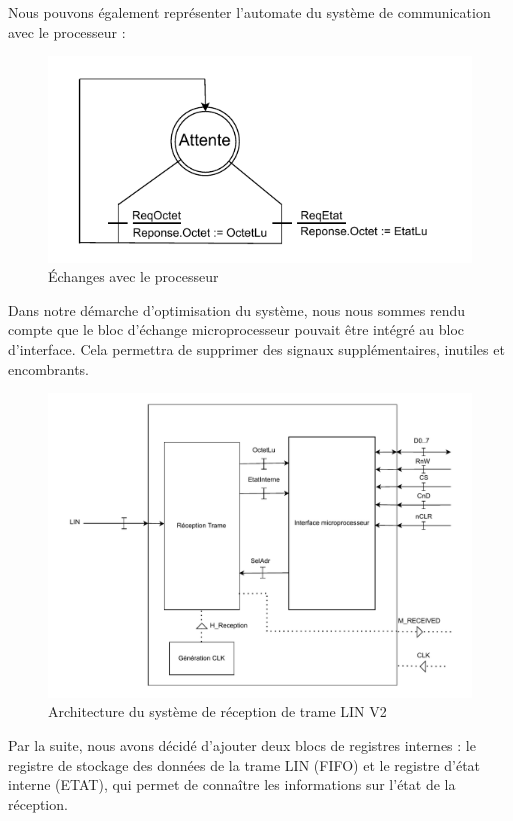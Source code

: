 Nous pouvons également représenter l'automate du système de communication avec le processeur : 

\begin{figure}[H]
    \centering
    \includegraphics[width=0.8\linewidth]{images/inter/Echange_Processeur.pdf}
    \caption{Échanges avec le processeur}
    \label{fig:placeholder}
\end{figure}


Dans notre démarche d'optimisation du système, nous nous sommes rendu compte que le bloc d'échange 
microprocesseur pouvait être intégré au bloc d'interface. Cela permettra de supprimer des signaux 
supplémentaires, inutiles et encombrants.
\newline

\begin{figure}[H]
    \centering
    \includegraphics[width=0.8\linewidth]{images/inter/Schema_avance_circuit.pdf}
    \caption{Architecture du système de réception de trame LIN V2}
    \label{fig:placeholder}
\end{figure}

Par la suite, nous avons décidé d'ajouter deux blocs de registres internes : le registre de stockage 
des données de la trame LIN (FIFO) et le registre d'état interne (ETAT), qui permet de connaître les 
informations sur l'état de la réception.
\newline

